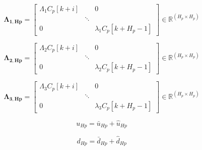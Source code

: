 \begin{equation}
\pmb{\Lambda_{1,Hp}} =
 \begin{bmatrix}
 \Lambda_1 C_p[k+i] & & 0 \\
 & \ddots & \\
 0 & & \lambda_1 C_p[k+H_p-1] 
 \end{bmatrix}
 \in \pmb{\mathbb{R}}^{(H_p \times H_p)}
\end{equation} 


\begin{equation}
\pmb{\Lambda_{2,Hp}} =
 \begin{bmatrix}
 \Lambda_2 C_p[k+i] & & 0 \\
 & \ddots & \\
 0 & & \lambda_2 C_p[k+H_p-1] 
 \end{bmatrix}
 \in \pmb{\mathbb{R}}^{(H_p \times H_p)}
\end{equation}


\begin{equation}
\pmb{\Lambda_{3,Hp}} =
 \begin{bmatrix}
 \Lambda_3 C_p[k+i] & & 0 \\
 & \ddots & \\
 0 & & \lambda_3 C_p[k+H_p-1] 
 \end{bmatrix}
 \in \pmb{\mathbb{R}}^{(H_p \times H_p)}
\end{equation}


\begin{equation}
u_{Hp} = \bar{u}_{Hp} + \hat{u}_{Hp}
\end{equation}


\begin{equation}
d_{Hp} = \bar{d}_{Hp} + \hat{d}_{Hp}
\end{equation}
